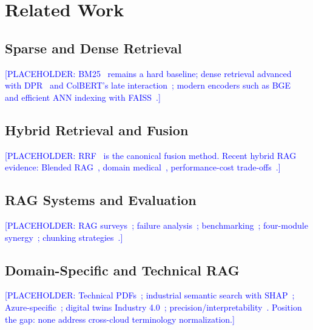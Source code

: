 \documentclass[conference]{IEEEtran}
\begin{document}
\section{Related Work}
\label{sec:related}

\subsection{Sparse and Dense Retrieval}
\textcolor{blue}{[PLACEHOLDER: BM25~\cite{robertson2009bm25} remains a hard baseline; dense retrieval advanced with DPR~\cite{karpukhin2020dpr} and ColBERT's late interaction~\cite{khattab2020colbert}; modern encoders such as BGE~\cite{xiao2023bge} and efficient ANN indexing with FAISS~\cite{johnson2019faiss}.]}

\subsection{Hybrid Retrieval and Fusion}
\textcolor{blue}{[PLACEHOLDER: RRF~\cite{cormack2009rrf} is the canonical fusion method. Recent hybrid RAG evidence: Blended RAG~\cite{sawarkar2024blendedrag}, domain medical~\cite{aljohani2026hybrid}, performance-cost trade-offs~\cite{kartiyanta2025costeffective}.]}

\subsection{RAG Systems and Evaluation}
\textcolor{blue}{[PLACEHOLDER: RAG surveys~\cite{gao2024ragsurvey,yu2024ragsurvey}; failure analysis~\cite{barnett2024sevenfailure}; benchmarking~\cite{wang2025corbrag,gan2025ragevaluation,krishna2024factfetchreason}; four-module synergy~\cite{shi2024fourmodule}; chunking strategies~\cite{peng2025latesplit,jadon2025domainspecific}.]}

\subsection{Domain-Specific and Technical RAG}
\textcolor{blue}{[PLACEHOLDER: Technical PDFs~\cite{rahman2025techpdfs}; industrial semantic search with SHAP~\cite{mahr2025shap}; Azure-specific~\cite{mahmood2025azureiq}; digital twins Industry 4.0~\cite{xia2024digitaltwins}; precision/interpretability~\cite{hindi2025precision}. Position the gap: none address cross-cloud terminology normalization.]}
\end{document}
